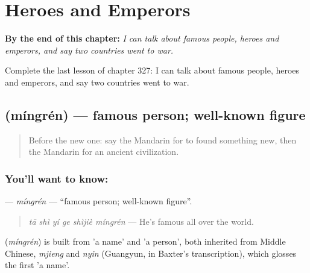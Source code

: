 
\chapter{Heroes and Emperors}
\label{ch:zh-heroes-and-emperors}

\begin{chapteropening}
\textbf{By the end of this chapter:} \emph{I can talk about famous people, heroes and emperors, and say two countries went to war.}

Complete the last lesson of chapter 327: I can talk about famous people, heroes and emperors, and say two countries went to war.
\end{chapteropening}

\section[\texorpdfstring{\zh{名人} (míngrén)}{名人 (míngrén)}]{ (míngrén) — famous person; well-known figure}

\label{lesson:ZH-C327-mingren}



\begin{quote}
Before the new one: say the Mandarin for to found something new, then the Mandarin for an ancient civilization.
\end{quote}

\subsection*{You'll want to know: }
\textbf{} — \emph{míngrén} — \textquotedblleft{}famous person; well-known figure\textquotedblright{}.

\begin{quote}
\textbf{} \emph{tā shì yí ge shìjiè míngrén} — He's famous all over the world.
\end{quote}

\begin{cousinweb}
\textbf{} (\emph{míngrén}) is built from  'a name' and  'a person', both inherited from Middle Chinese, \emph{mjieng} and \emph{nyin} (Guangyun, in Baxter's transcription), which glosses the first 'a name'.
\end{cousinweb}

